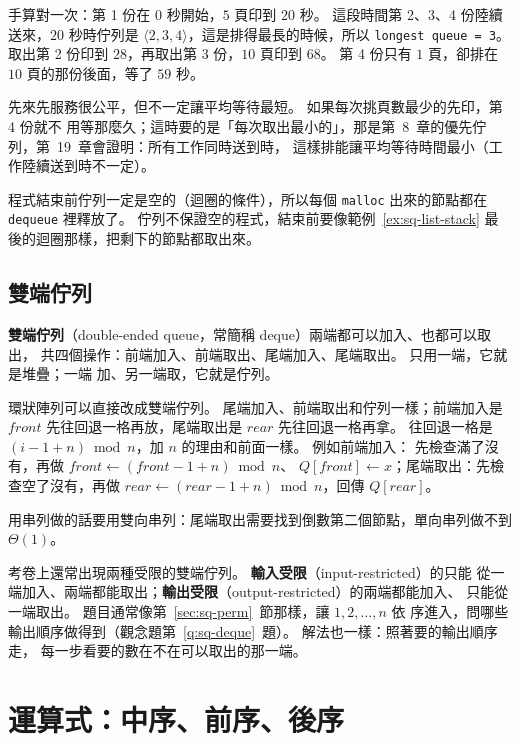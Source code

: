 手算對一次：第 1 份在 $0$ 秒開始，$5$ 頁印到 $20$ 秒。 這段時間第 2、3、4 份陸續
送來，$20$ 秒時佇列是 $\langle 2, 3, 4 \rangle$，這是排得最長的時候，所以
\texttt{longest queue = 3}。 取出第 2 份印到 $28$，再取出第 3 份，$10$ 頁印到
$68$。 第 4 份只有 $1$ 頁，卻排在 $10$ 頁的那份後面，等了 $59$ 秒。

先來先服務很公平，但不一定讓平均等待最短。 如果每次挑頁數最少的先印，第 4 份就不
用等那麼久；這時要的是「每次取出最小的」，那是第~8~章的優先佇列，第~19~章會證明：所有工作同時送到時，
這樣排能讓平均等待時間最小（工作陸續送到時不一定）。

程式結束前佇列一定是空的（迴圈的條件），所以每個 \texttt{malloc} 出來的節點都在
\texttt{dequeue} 裡釋放了。 佇列不保證空的程式，結束前要像範例~\ref{ex:sq-list-stack}
最後的迴圈那樣，把剩下的節點都取出來。

\subsection{雙端佇列}
\label{sec:sq-deque}

\textbf{雙端佇列}（double-ended queue，常簡稱 deque）兩端都可以加入、也都可以取出，
共四個操作：前端加入、前端取出、尾端加入、尾端取出。 只用一端，它就是堆疊；一端
加、另一端取，它就是佇列。

環狀陣列可以直接改成雙端佇列。 尾端加入、前端取出和佇列一樣；前端加入是
$\mathit{front}$ 先往回退一格再放，尾端取出是 $\mathit{rear}$ 先往回退一格再拿。
往回退一格是 $(i - 1 + n) \bmod n$，加 $n$ 的理由和前面一樣。 例如前端加入：
先檢查滿了沒有，再做 $\mathit{front} \gets (\mathit{front} - 1 + n) \bmod n$、
$Q[\mathit{front}] \gets x$；尾端取出：先檢查空了沒有，再做
$\mathit{rear} \gets (\mathit{rear} - 1 + n) \bmod n$，回傳 $Q[\mathit{rear}]$。

用串列做的話要用雙向串列：尾端取出需要找到倒數第二個節點，單向串列做不到
$\Theta(1)$。

考卷上還常出現兩種受限的雙端佇列。 \textbf{輸入受限}（input-restricted）的只能
從一端加入、兩端都能取出；\textbf{輸出受限}（output-restricted）的兩端都能加入、
只能從一端取出。 題目通常像第~\ref{sec:sq-perm}~節那樣，讓 $1, 2, \ldots, n$ 依
序進入，問哪些輸出順序做得到（觀念題第~\ref{q:sq-deque}~題）。 解法也一樣：照著要的輸出順序走，
每一步看要的數在不在可以取出的那一端。

\section{運算式：中序、前序、後序}
\label{sec:sq-expr}

